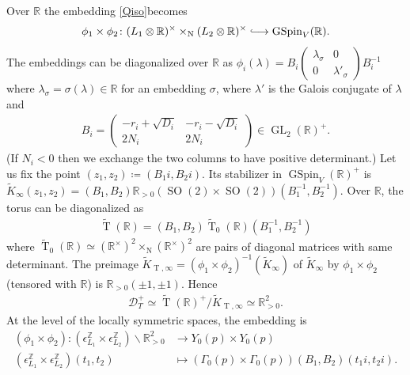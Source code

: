 \documentclass[11pt]{article} %
\newcommand{\8}{\infty}
\newcommand{\Z}{\mathbb{Z}}
\newcommand{\GSpin}{\operatorname{GSpin}}
\newcommand{\Tbf}{\operatorname{T}}
\newcommand{\SO}{\operatorname{SO}}
\newcommand{\GL}{\operatorname{GL}}
\newcommand{\Ktil}{\widetilde{K}}
\newcommand{\Ttil}{\widetilde{\operatorname{T}}}
\newcommand{\D}{\mathcal{D}}
\newcommand{\R}{\mathbb{R}}
\newcommand{\N}{\operatorname{N}}
\newcommand{\hooklongrightarrow}{\lhook\joinrel\longrightarrow}
\theoremstyle{mytheoremstyle}
\theoremstyle{remark}
\numberwithin{equation}{section}
\begin{document}
\subsubsection{} Over $\R$ the embedding \eqref{Qiso}becomes
\begin{align}
    \phi_1 \times \phi_2 \colon (L_1 \otimes \R)^\times \times_{\N} (L_2 \otimes \R)^\times \hooklongrightarrow \GSpin_V(\R).
\end{align}
The embeddings can be diagonalized over $\R$ as $\phi_i(\lambda)=B_i \begin{pmatrix}
    \lambda_{\sigma} & 0 \\ 0 & \lambda'_{\sigma}
\end{pmatrix}B_i^{-1}$
where $\lambda_{\sigma}=\sigma(\lambda) \in \R$ for an embedding $\sigma$, where $\lambda'$ is the Galois conjugate of $\lambda$ and
\begin{align}
    B_i=\begin{pmatrix}
        -r_i + \sqrt{D_i} & -r_i - \sqrt{D_i} \\ 2N_i & 2N_i
    \end{pmatrix} \in \GL_2(\R)^+.
\end{align}
(If $N_i<0$ then we exchange the two columns to have positive determinant.) Let us fix the point $(z_1,z_2)\coloneqq (B_{1}i,B_{2}i)$. Its stabilizer in $\GSpin_V(\R)^+$ is $\Ktil_\8(z_1,z_2)=(B_{1},B_{2}) \R_{>0}(\SO(2) \times \SO(2)) (B_{1}^{-1},B_{2}^{-1})$. Over $\R$, the torus can be diagonalized as
\begin{align}
    \Ttil(\R)=(B_{1},B_{2}) \Ttil_0(\R) (B_{1}^{-1},B_{2}^{-1})
\end{align} where $\Ttil_0(\R) \simeq (\R^\times)^2 \times_{\N} (\R^\times)^2$ are pairs of diagonal matrices with same determinant. The preimage $\Ktil_{\Tbf,\8} = (\phi_1 \times \phi_2)^{-1}(\Ktil_\8)$ of $\Ktil_\8$ by $\phi_1 \times \phi_2$ (tensored with $\R$) is $\R_{>0}(\pm 1, \pm 1)$. 
Hence 
\begin{align}
    \D_T^+ \simeq \Ttil(\R)^+/\Ktil_{\Tbf,\8} \simeq \R_{>0}^2.
\end{align}At the level of the locally symmetric spaces, the embedding is
\begin{align}\label{localemb}
    (\phi_1 \times \phi_2) \colon (\epsilon_{L_1}^\Z \times \epsilon_{L_2}^\Z) \backslash \R_{>0}^2 & \longrightarrow Y_0(p) \times Y_0(p) \nonumber \\
    (\epsilon_{L_1}^\Z \times \epsilon_{L_2}^\Z)(t_1,t_2) & \longmapsto (\Gamma_0(p) \times \Gamma_0(p))(B_1,B_2)(t_1i,t_2i).
\end{align}
\end{document}
